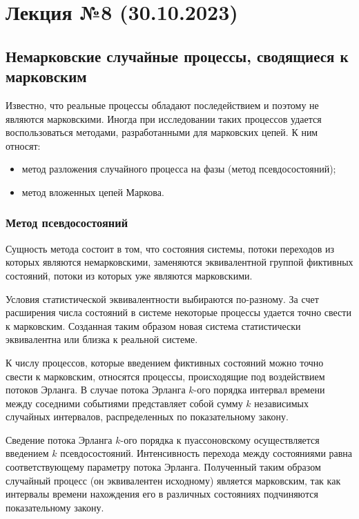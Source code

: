 \section{Лекция №8 (30.10.2023)}

\subsection{Немарковские случайные процессы, сводящиеся к марковским}

Известно, что реальные процессы обладают последействием и поэтому не являются марковскими. Иногда при исследовании таких процессов удается воспользоваться методами, разработанными для марковских цепей. К ним относят:

\begin{itemize}
    \item метод разложения случайного процесса на фазы (метод псевдосостояний);
    \item метод вложенных цепей Маркова.
\end{itemize}

\subsubsection{Метод псевдосостояний}

Сущность метода состоит в том, что состояния системы, потоки переходов из которых являются немарковскими, заменяются эквивалентной группой фиктивных состояний, потоки из которых уже являются марковскими.

Условия статистической эквивалентности выбираются по-разному. За счет расширения числа состояний в системе некоторые процессы удается точно свести к марковским. Созданная таким образом новая система статистически эквивалентна или близка к реальной системе.

К числу процессов, которые введением фиктивных состояний можно точно свести к марковским, относятся процессы, происходящие под воздействием потоков Эрланга. В случае потока Эрланга $k$-ого порядка интервал времени между соседними событиями представляет собой сумму $k$ независимых случайных интервалов, распределенных по показательному закону.

Сведение потока Эрланга $k$-ого порядка к пуассоновскому осуществляется введением $k$ псевдосостояний. Интенсивность перехода между состояниями равна соответствующему параметру потока Эрланга. Полученный таким образом случайный процесс (он эквивалентен исходному) является марковским, так как интервалы времени нахождения его в различных состояниях подчиняются показательному закону.

